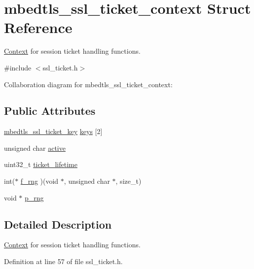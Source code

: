 \hypertarget{structmbedtls__ssl__ticket__context}{}\section{mbedtls\+\_\+ssl\+\_\+ticket\+\_\+context Struct Reference}
\label{structmbedtls__ssl__ticket__context}


\mbox{\hyperlink{struct_context}{Context}} for session ticket handling functions.  




{\ttfamily \#include $<$ssl\+\_\+ticket.\+h$>$}



Collaboration diagram for mbedtls\+\_\+ssl\+\_\+ticket\+\_\+context\+:
\subsection*{Public Attributes}
\begin{DoxyCompactItemize}
\item 
\mbox{\hyperlink{structmbedtls__ssl__ticket__key}{mbedtls\+\_\+ssl\+\_\+ticket\+\_\+key}} \mbox{\hyperlink{structmbedtls__ssl__ticket__context_a92f8b74506a299795117cf0b60504442}{keys}} \mbox{[}2\mbox{]}
\item 
unsigned char \mbox{\hyperlink{structmbedtls__ssl__ticket__context_aed5bcb363146b9498dd1345e5c141044}{active}}
\item 
uint32\+\_\+t \mbox{\hyperlink{structmbedtls__ssl__ticket__context_ae2548112f1ab8d5ceb7752a205ce358c}{ticket\+\_\+lifetime}}
\item 
int($\ast$ \mbox{\hyperlink{structmbedtls__ssl__ticket__context_a160abf782f580574b39d1e9e31a441e8}{f\+\_\+rng}} )(void $\ast$, unsigned char $\ast$, size\+\_\+t)
\item 
void $\ast$ \mbox{\hyperlink{structmbedtls__ssl__ticket__context_a304d8f181d24a4ddbe5b7f0052229b9c}{p\+\_\+rng}}
\end{DoxyCompactItemize}


\subsection{Detailed Description}
\mbox{\hyperlink{struct_context}{Context}} for session ticket handling functions. 

Definition at line 57 of file ssl\+\_\+ticket.\+h.



